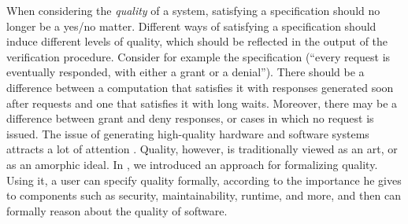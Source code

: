 \documentclass{llncs}
\begin{document}
When considering the \emph{quality} of a system,
satisfying a specification should no longer be a yes/no matter. Different ways of satisfying a specification should induce different levels of quality, which should be reflected in the output of the verification procedure. Consider for example the specification
 (``every request is eventually responded, with either a grant or a denial''). There should be a difference between a computation that satisfies it with responses generated soon after requests and one that satisfies it with long waits. Moreover, there may be a difference between grant and deny responses, or cases in which no request is issued.
The issue of generating high-quality hardware and software systems attracts a lot of attention \cite{Kan02,Spi06}. Quality, however, is traditionally viewed as an art, or as an amorphic ideal.  
In \cite{ABK13}, we introduced an approach for formalizing quality. Using it, a user can specify quality formally, according to the importance he gives to components such as security, maintainability, runtime, and more, and then can formally reason about the quality of software.
\end{document}
